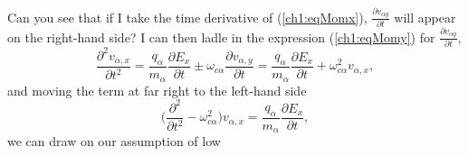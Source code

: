 Can you see that if I take the time derivative of (\ref{ch1:eqMomx}),
$\frac{\partial v_{\alpha y}}{\partial t}$ will appear on the right-hand side?
I can then ladle in the expression (\ref{ch1:eqMomy}) for $\frac{\partial
  v_{\alpha y}}{\partial t}$,
\begin{equation*} \label{ch1:eqMomxdt} \dfrac{\partial^2 v_{\alpha,x}}{\partial
    t^2} = \dfrac{q_\alpha}{m_\alpha}\dfrac{\partial E_x}{\partial t} \pm
  \omega_{c \alpha} \dfrac{\partial v_{\alpha,y}}{\partial t} =
  \dfrac{q_\alpha}{m_\alpha}\dfrac{\partial E_x}{\partial t} + \omega_{c
    \alpha}^2 v_{\alpha,x},
\end{equation*}
and moving the term at far right to the left-hand side
\begin{equation*} \big ( \dfrac{\partial^2}{\partial t^2} - \omega_{c \alpha}^2
  \big ) v_{\alpha,x} = \dfrac{q_\alpha}{m_\alpha}\dfrac{\partial E_x}{\partial
    t},
\end{equation*}
we can draw on our assumption of low 

